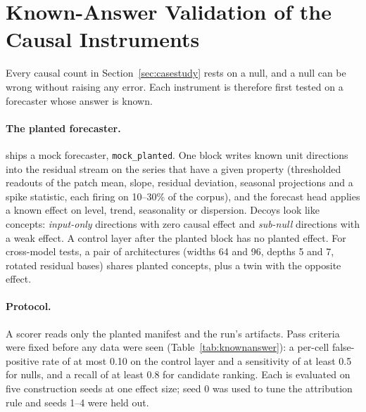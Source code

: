 \section{Known-Answer Validation of the Causal Instruments}
\label{sec:knownanswer}

Every causal count in Section~\ref{sec:casestudy} rests on a null, and a null can be wrong without raising any error.
Each instrument is therefore first tested on a forecaster whose answer is known.

\paragraph{The planted forecaster.} \tool{} ships a mock forecaster, \texttt{mock\_planted}. One block writes known unit
directions into the residual stream on the series that have a given property (thresholded readouts of the patch mean,
slope, residual deviation, seasonal projections and a spike statistic, each firing on 10--30\% of the corpus), and the
forecast head applies a known effect on level, trend, seasonality or dispersion. Decoys look like concepts:
\emph{input-only} directions with zero causal effect and \emph{sub-null} directions with a weak effect. A control layer
after the planted block has no planted effect. For cross-model tests, a pair of architectures (widths 64 and 96, depths
5 and 7, rotated residual bases) shares planted concepts, plus a twin with the opposite effect.

\paragraph{Protocol.} A scorer reads only the planted manifest and the run's artifacts. Pass criteria were fixed before
any data were seen (Table~\ref{tab:knownanswer}): a per-cell false-positive rate of at most 0.10 on the control layer and
a sensitivity of at least 0.5 for nulls, and a recall of at least 0.8 for candidate ranking. Each is evaluated on five
construction seeds at one effect size; seed 0 was used to tune the attribution rule and seeds 1--4 were held out.

